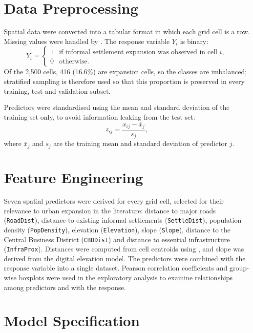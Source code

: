 \section{Data Preprocessing}

Spatial data were converted into a tabular format in which each grid cell is a
row. Missing values were handled by . The response variable $Y_i$ is binary:
\begin{equation}
Y_i =
\begin{cases}
1 & \text{if informal settlement expansion was observed in cell } i,\\
0 & \text{otherwise.}
\end{cases}
\end{equation}
Of the 2{,}500 cells, 416 (16.6\%) are expansion cells, so the classes are
imbalanced; stratified sampling is therefore used so that this proportion is
preserved in every training, test and validation subset.

Predictors were standardised using the mean and standard deviation of the
training set only, to avoid information leaking from the test set:
\begin{equation}
z_{ij} = \frac{x_{ij} - \bar{x}_j}{s_j},
\end{equation}
where $\bar{x}_j$ and $s_j$ are the training mean and standard deviation of
predictor $j$.

\section{Feature Engineering}

Seven spatial predictors were derived for every grid cell, selected for their
relevance to urban expansion in the literature: distance to major roads
(\texttt{RoadDist}), distance to existing informal settlements
(\texttt{SettleDist}), population density (\texttt{PopDensity}), elevation
(\texttt{Elevation}), slope (\texttt{Slope}), distance to the Central Business
District (\texttt{CBDDist}) and distance to essential infrastructure
(\texttt{InfraProx}). Distances were computed from cell centroids using
, and slope was derived from the digital elevation
model. The predictors were combined with the response variable into a single
dataset. Pearson correlation coefficients and group-wise boxplots were used
in the exploratory analysis to examine relationships among predictors and with
the response.

\section{Model Specification}

